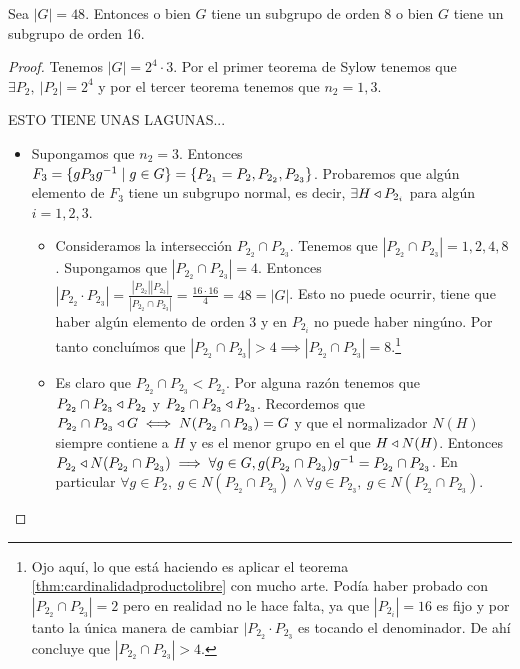 \begin{ej}
	Sea $|G| = 48$. Entonces o bien $G$ tiene un subgrupo de orden 8 o bien $G$ tiene un subgrupo de orden 16.
	
	\begin{proof}
		Tenemos $|G| = 2^4 \cdot 3$. Por el primer teorema de Sylow tenemos que $\exists P_2,\ |P_2| = 2^4$ y por el tercer teorema tenemos que $n_2 = 1, 3$.
		
		ESTO TIENE UNAS LAGUNAS...
		\begin{itemize}
			\item Supongamos que $n_2 = 3$. Entonces $F_3 = \{gP_3 g^{-1} \mid g \in G\} = \{P_{2_1} = P_2, P_{2_2}, P_{2_3}\}$. Probaremos que algún elemento de $F_3$ tiene un subgrupo normal, es decir, $\exists H \mathbin{\triangleleft} P_{2_i}$ para algún $i = 1, 2, 3$.
			\begin{itemize}
				\item Consideramos la intersección $P_{2_2} \cap P_{2_3}$. Tenemos que $|P_{2_2} \cap P_{2_3}| = 1, 2, 4, 8$. Supongamos que $|P_{2_2} \cap P_{2_3}| = 4$. Entonces $|P_{2_2} \cdot P_{2_3}| = \frac{|P_{2_2}||P_{2_3}|}{|P_{2_2} \cap P_{2_3}|} = \frac{16 \cdot 16}{4} = 48 = |G|$. Esto no puede ocurrir, tiene que haber algún elemento de orden $3$ y en $P_{2_i}$ no puede haber ningúno. Por tanto concluímos que $|P_{2_2} \cap P_{2_3}| > 4 \implies |P_{2_2} \cap P_{2_3}| = 8$.\footnote{Ojo aquí, lo que está haciendo es aplicar el teorema \ref{thm:cardinalidadproductolibre} con mucho arte. Podía haber probado con $|P_{2_2} \cap P_{2_3}| = 2$ pero en realidad no le hace falta, ya que $|P_{2_i}| = 16$ es fijo y por tanto la única manera de cambiar $|P_{2_2} \cdot P_{2_3}$ es tocando el denominador. De ahí concluye que $|P_{2_2} \cap P_{2_3}| > 4$.}
				\item Es claro que $P_{2_2} \cap P_{2_3} < P_{2_2}$. Por alguna razón tenemos que $P_{2_2} \cap P_{2_3} \mathbin{\triangleleft} P_{2_2}$ y $P_{2_2} \cap P_{2_3} \mathbin{\triangleleft} P_{2_3}$. Recordemos que $P_{2_2} \cap P_{2_3} \mathbin{\triangleleft} G \iff N(P_{2_2} \cap P_{2_3}) = G$ y que el normalizador $N(H)$ siempre contiene a $H$ y es el menor grupo en el que $H \mathbin{\triangleleft} N(H)$. Entonces $P_{2_2} \mathbin{\triangleleft} N(P_{2_2} \cap P_{2_3}) \implies \forall g \in G, g(P_{2_2} \cap P_{2_3})g^{-1} = P_{2_2} \cap P_{2_3}$. En particular $\forall g \in P_2,\ g \in N(P_{2_2} \cap P_{2_3}) \land \forall g \in P_{2_3},\ g \in N(P_{2_2} \cap P_{2_3})$.
			\end{itemize}
		\end{itemize}
	\end{proof}
\end{ej}


